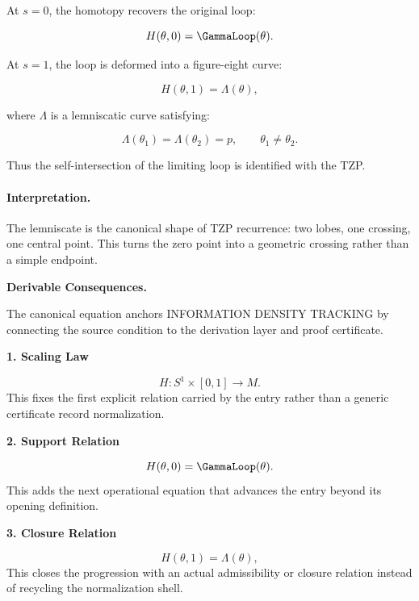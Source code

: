 At $s=0$, the homotopy recovers the original loop:

\begin{equation}
H(\theta,0)=\GammaLoop(\theta).
\end{equation}

At $s=1$, the loop is deformed into a figure-eight curve:

\begin{equation}
H(\theta,1)=\Lambda(\theta),
\end{equation}

where $\Lambda$ is a lemniscatic curve satisfying:

\begin{equation}
\Lambda(\theta_1)=\Lambda(\theta_2)=p,
\qquad
\theta_1\neq\theta_2 .
\end{equation}

Thus the self-intersection of the limiting loop is identified with the TZP.

\paragraph{Interpretation.}
The lemniscate is the canonical shape of TZP recurrence: two lobes, one crossing, one central point. This turns the zero point into a geometric crossing rather than a simple endpoint.

\par\vspace{0.35em}
\noindent\textbf{Derivable Consequences.}\quad
\begingroup
\footnotesize
\raggedright
The canonical equation anchors INFORMATION DENSITY TRACKING by connecting the source condition to the derivation layer and proof certificate.
\par\endgroup

\noindent\textbf{1. Scaling Law}\par
\[
H:S^1\times[0,1]\to M.
\]
\noindent This fixes the first explicit relation carried by the entry rather than a generic certificate record normalization.\par
\noindent\textbf{2. Support Relation}\par
\[
H(\theta,0)=\GammaLoop(\theta).
\]
\noindent This adds the next operational equation that advances the entry beyond its opening definition.\par
\noindent\textbf{3. Closure Relation}\par
\[
H(\theta,1)=\Lambda(\theta),
\]
\noindent This closes the progression with an actual admissibility or closure relation instead of recycling the normalization shell.\par

